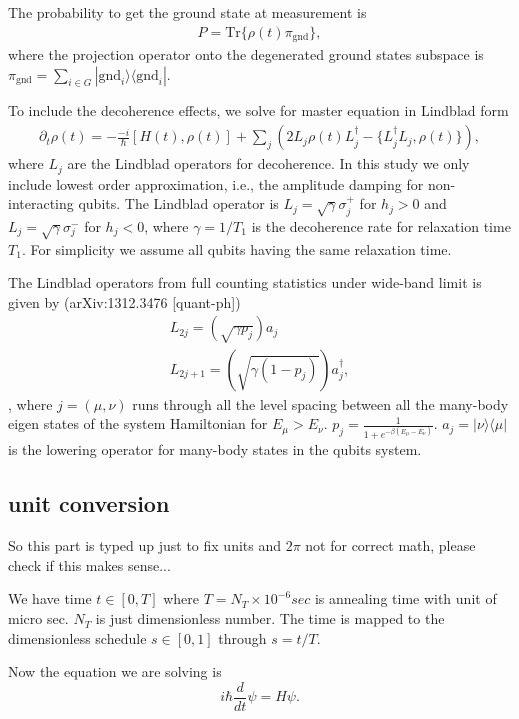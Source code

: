 \documentclass[]{article}
\begin{document}
The probability to get the ground state at measurement is
\begin{align}
P =  \mbox{Tr} \{  \rho (t) \pi_{\mbox{gnd}} \}  ,
\end{align}
where the projection operator onto the degenerated ground states subspace is $\pi_{\mbox{gnd}}=\sum_{i\in G} |\mbox{gnd}_i\rangle \langle \mbox{gnd}_i| $.


To include the decoherence effects, we solve for master equation in Lindblad form
\begin{align}
  \partial_t \rho (t) = - \frac{-i}{\hbar} [H(t) , \rho(t)] + \sum_j (2L_j \rho(t) L_j^\dagger - \{ L^\dagger_j L_j, \rho(t) \}) ,
\end{align}
where $L_j$ are the Lindblad operators for decoherence. In this study we only include lowest order approximation, i.e., the amplitude damping for non-interacting qubits. The Lindblad operator is $L_j=\sqrt{\gamma} \sigma^{+}_j$ for $h_j>0$ and $L_j=\sqrt{\gamma} \sigma^{-}_j$ for $h_j<0$, where $\gamma=1/T_1$ is the decoherence rate for relaxation time $T_1$. For simplicity we assume all qubits having the same relaxation time.


The Lindblad operators from full counting statistics under wide-band limit is given by (arXiv:1312.3476 [quant-ph])
\begin{align}
  L_{2j}=(\sqrt{\gamma p_j}) a_j \\
  L_{2j+1}=(\sqrt{\gamma (1-p_j)} )a_j^\dagger ,
\end{align}
, where $j=(\mu,\nu)$ runs through all the level spacing between all the many-body eigen states of the system Hamiltonian for $E_\mu > E_\nu$. $p_j=\frac{1}{1+e^{-\beta (E_\mu-E_\nu)}}$. $a_j=|\nu \rangle \langle \mu |$ is the lowering operator for many-body states in the qubits system.



\subsection{unit conversion}

So this part is typed up just to fix units and $2\pi$ not for correct math, please check if this makes sense...


We have time $t \in [0,T]$ where $T=N_T \times 10^{-6} sec$ is annealing time with unit of micro sec. $N_T$ is just dimensionless number. The time is mapped to the dimensionless schedule $s\in [0,1]$ through $s=t/T$.

Now the equation we are solving is
\begin{equation}
 i \hbar \frac{d}{dt}\psi = H \psi .
\end{equation}
\end{document}
